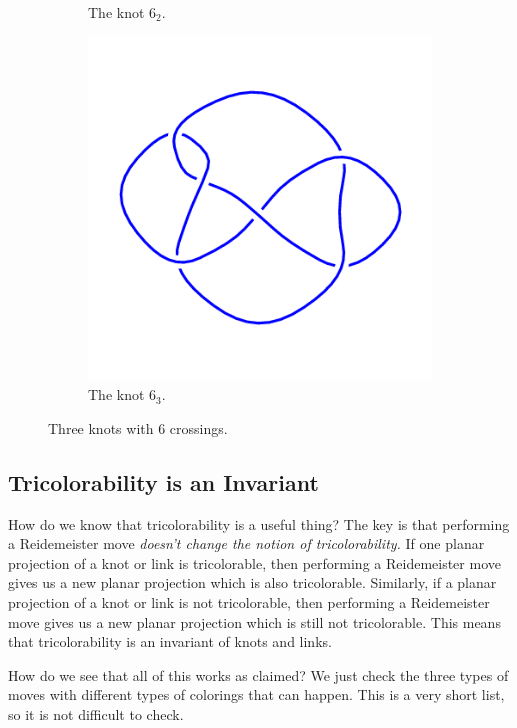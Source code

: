 \documentclass[12pt,letterpaper]{article}
\theoremstyle{definition}
\begin{document}
\begin{figure}[h]
\begin{subfigure}{.3\textwidth}
        \caption{The knot $6_2$.}
    \end{subfigure}
    \quad
    \begin{subfigure}{.3\textwidth}
        \centering
        \includegraphics[width=\textwidth]{rgp08pics/6_3.png}
        \caption{The knot $6_3$.}
    \end{subfigure}
\caption{Three knots with 6 crossings.}
\end{figure}

\subsection*{Tricolorability is an Invariant}

How do we know that tricolorability is a useful thing?
The key is that performing a Reidemeister move \emph{doesn't change the notion of tricolorability.}
If one planar projection of a knot or link is tricolorable, then performing a Reidemeister move gives us a new planar projection which is also tricolorable.
Similarly, if a planar projection of a knot or link is not tricolorable, then performing a Reidemeister move gives us a new planar projection which is still not tricolorable.
This means that tricolorability is an invariant of knots and links.

How do we see that all of this works as claimed?
We just check the three types of moves with different types of colorings that can happen. 
This is a very short list, so it is not difficult to check.
\end{document}
